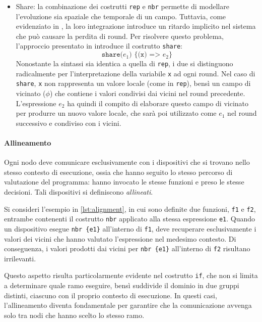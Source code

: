 \begin{itemize}
    \item Share: la combinazione dei costrutti \texttt{rep} e \texttt{nbr} permette di modellare l'evoluzione sia spaziale che temporale di un campo. Tuttavia, come evidenziato in \cite{UniversalityFC}, la loro integrazione introduce un ritardo implicito nel sistema che può causare la perdita di round. Per risolvere questo problema, l'approccio presentato in \cite{Share} introduce il costrutto \texttt{share}:
    \[
    \texttt{share(\(e_1\)) \{(x) => \(e_2\)\}}
    \]
    Nonostante la sintassi sia identica a quella di \texttt{rep}, i due si distinguono radicalmente per l'interpretazione della variabile \texttt{x} ad ogni round. Nel caso di \texttt{share}, \texttt{x} non rappresenta un valore locale (come in \texttt{rep}), bensì un campo di vicinato ($\phi$) che contiene i valori condivisi dai vicini nel round precedente. L'espressione \texttt{\(e_2\)} ha quindi il compito di elaborare questo campo di vicinato per produrre un nuovo valore locale, che sarà poi utilizzato come \texttt{\(e_1\)} nel round successivo e condiviso con i vicini.
\end{itemize}

\paragraph{Allineamento} Ogni nodo deve comunicare esclusivamente con i dispositivi che si trovano nello stesso contesto di esecuzione, ossia che hanno seguito lo stesso percorso di valutazione del programma: hanno invocato le stesse funzioni e preso le stesse decisioni. Tali dispositivi si definiscono \textit{allineati}.

Si consideri l'esempio in \cref{lst:alignment}, in cui sono definite due funzioni, \texttt{f1} e \texttt{f2}, entrambe contenenti il costrutto \texttt{nbr} applicato alla stessa espressione \texttt{e1}. Quando un dispositivo esegue \texttt{nbr \{e1\}} all'interno di \texttt{f1}, deve recuperare esclusivamente i valori dei vicini che hanno valutato l'espressione nel medesimo contesto. Di conseguenza, i valori prodotti dai vicini per \texttt{nbr \{e1\}} all'interno di \texttt{f2} risultano irrilevanti.


Questo aspetto risulta particolarmente evidente nel costrutto \texttt{if}, che non si limita a determinare quale ramo eseguire, bensì suddivide il dominio in due gruppi distinti, ciascuno con il proprio contesto di esecuzione. In questi casi, l'allineamento diventa fondamentale per garantire che la comunicazione avvenga solo tra nodi che hanno scelto lo stesso ramo.

